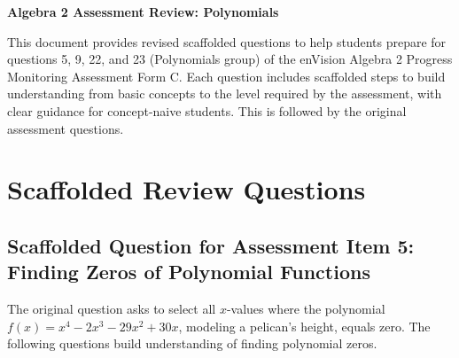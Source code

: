 \documentclass[12pt]{article}
\begin{document}
\begin{center}
    \textbf{Algebra 2 Assessment Review: Polynomials}
\end{center}

This document provides revised scaffolded questions to help students prepare for questions 5, 9, 22, and 23 (Polynomials group) of the enVision Algebra 2 Progress Monitoring Assessment Form C. Each question includes scaffolded steps to build understanding from basic concepts to the level required by the assessment, with clear guidance for concept-naive students. This is followed by the original assessment questions.

\section*{Scaffolded Review Questions}

\subsection*{Scaffolded Question for Assessment Item 5: Finding Zeros of Polynomial Functions}
The original question asks to select all \( x \)-values where the polynomial \( f(x) = x^4 - 2x^3 - 29x^2 + 30x \), modeling a pelican’s height, equals zero. The following questions build understanding of finding polynomial zeros.
\end{document}
